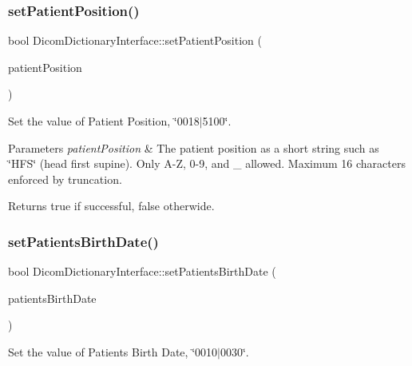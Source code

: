 \subsubsection{\texorpdfstring{set\+Patient\+Position()}{setPatientPosition()}}
{\footnotesize\ttfamily bool Dicom\+Dictionary\+Interface\+::set\+Patient\+Position (\begin{DoxyParamCaption}\item[{Q\+String}]{patient\+Position }\end{DoxyParamCaption})}



Set the value of Patient Position, \char`\"{}0018$\vert$5100\char`\"{}. 


\begin{DoxyParams}{Parameters}
{\em patient\+Position} & The patient position as a short string such as \char`\"{}\+H\+F\+S\char`\"{} (head first supine). Only \textquotesingle{}A\textquotesingle{}-\/\textquotesingle{}Z\textquotesingle{}, \textquotesingle{}0\textquotesingle{}-\/\textquotesingle{}9\textquotesingle{}, \textquotesingle{} \textquotesingle{} and \textquotesingle{}\+\_\+\textquotesingle{} allowed. Maximum 16 characters enforced by truncation. \\
\hline
\end{DoxyParams}
\begin{DoxyReturn}{Returns}
true if successful, false otherwide. 
\end{DoxyReturn}
\mbox{\label{class_dicom_dictionary_interface_ab119dcc2983350c039c242d5797ac841}} 
\subsubsection{\texorpdfstring{set\+Patients\+Birth\+Date()}{setPatientsBirthDate()}}
{\footnotesize\ttfamily bool Dicom\+Dictionary\+Interface\+::set\+Patients\+Birth\+Date (\begin{DoxyParamCaption}\item[{Q\+String}]{patients\+Birth\+Date }\end{DoxyParamCaption})}



Set the value of Patient\textquotesingle{}s Birth Date, \char`\"{}0010$\vert$0030\char`\"{}. 



